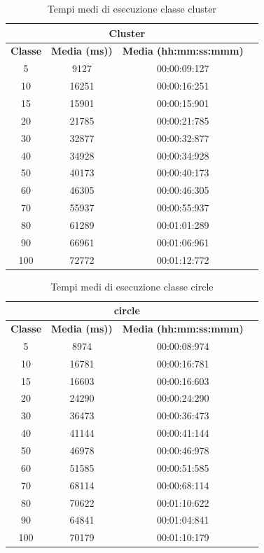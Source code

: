 \begin{table}[htbp]
\centering
\label{pt1:time:tabular_random}
\begin{tabular}{|c|c|c|c|}
\hline
\multicolumn{3}{|c|}{Cluster}\\
\hline
\textbf{Classe} & \textbf{Media (ms))} & \textbf{Media (hh:mm:ss:mmm)}\\
\hline
5   &   9127 & 00:00:09:127\\
\hline
10  &  16251 & 00:00:16:251\\
\hline
15  &  15901 & 00:00:15:901\\
\hline
20  &  21785 & 00:00:21:785\\
\hline
30  &  32877 & 00:00:32:877\\
\hline
40  &  34928 & 00:00:34:928\\
\hline
50  &  40173 & 00:00:40:173\\
\hline
60  &  46305 & 00:00:46:305\\
\hline
70  &  55937 & 00:00:55:937\\
\hline
80  &  61289 & 00:01:01:289\\
\hline
90  &  66961 & 00:01:06:961\\
\hline
100 &  72772 & 00:01:12:772\\
\hline
\end{tabular}
\caption{Tempi medi di esecuzione classe cluster}
\end{table}

\begin{table}[htbp]
\centering
\label{pt1:time:tabular_random}
\begin{tabular}{|c|c|c|c|}
\hline
\multicolumn{3}{|c|}{circle}\\
\hline
\textbf{Classe} & \textbf{Media (ms))} & \textbf{Media (hh:mm:ss:mmm)}\\
\hline
5   &   8974 & 00:00:08:974\\
\hline
10  &  16781 & 00:00:16:781\\
\hline
15  &  16603 & 00:00:16:603\\
\hline
20  &  24290 & 00:00:24:290\\
\hline
30  &  36473 & 00:00:36:473\\
\hline
40  &  41144 & 00:00:41:144\\
\hline
50  &  46978 & 00:00:46:978\\
\hline
60  &  51585 & 00:00:51:585\\
\hline
70  &  68114 & 00:00:68:114\\
\hline
80  &  70622 & 00:01:10:622\\
\hline
90  &  64841 & 00:01:04:841\\
\hline
100 &  70179 & 00:01:10:179\\
\hline
\end{tabular}
\caption{Tempi medi di esecuzione classe circle}
\end{table}

